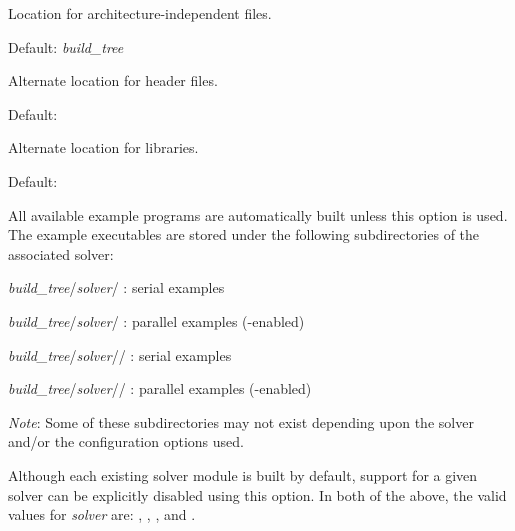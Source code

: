 \begin{config}
  
\item {}
  
  Location for architecture-independent files.
  
  Default:  {\em build\_tree}
  
\item {}
  
  Alternate location for header files.
  
  Default: 
  
\item {}
  
  Alternate location for libraries.
  
  Default: 
  
\item {}
  
  All available example programs are automatically built unless this option is
  used. The example executables are stored under the following subdirectories
  of the associated solver: 
  
  \begin{config}
  \item {\em build\_tree}/{\em solver}/ : serial {\C} examples
  \item {\em build\_tree}/{\em solver}/ : parallel {\C} examples ({\mpi}-enabled)
  \item {\em build\_tree}/{\em solver}// : serial {\F} examples
  \item {\em build\_tree}/{\em solver}// : parallel {\F} examples ({\mpi}-enabled)
  \end{config}
  
  {\em Note}: Some of these subdirectories may not exist depending upon the
  solver and/or the configuration options used.
  
\item {}

  Although each existing solver module is built by default, support for a
  given solver can be explicitly disabled using this option. In both of the
  above, the valid values for {\em solver} are: , ,
  , and .
  
\item {}


\end{config}
